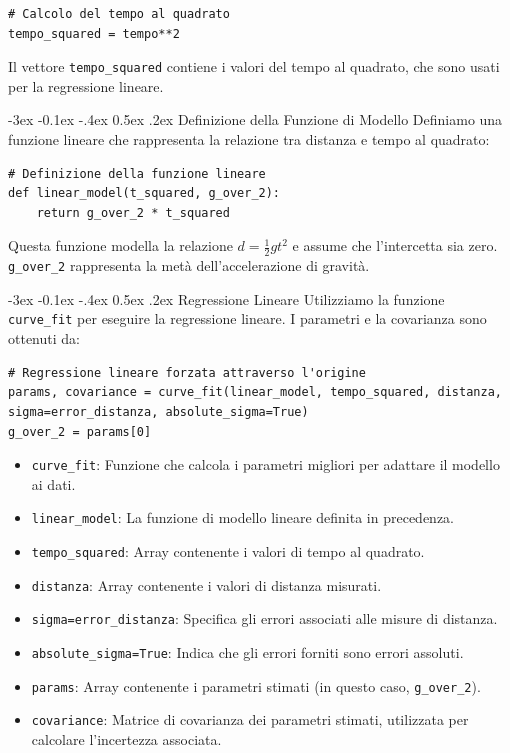 \documentclass[12pt,a4paper,oneside]{book}
\makeatletter
\renewcommand{\subsection}{\@startsection {subsection}{2}{\z@}
{-3ex \@plus -0.1ex \@minus -.4ex}
{0.5ex \@plus.2ex }
{\color[rgb]{0.141,0.596,0.749}\normalfont\sffamily\bfseries}}
\theoremstyle{esercizio}
\makeatother
\begin{document}
\begin{lstlisting}
# Calcolo del tempo al quadrato
tempo_squared = tempo**2
\end{lstlisting}

Il vettore \texttt{tempo\_squared} contiene i valori del tempo al quadrato, che sono usati per la regressione lineare.

\subsection{Definizione della Funzione di Modello}
Definiamo una funzione lineare che rappresenta la relazione tra distanza e tempo al quadrato:

\begin{lstlisting}
# Definizione della funzione lineare
def linear_model(t_squared, g_over_2):
    return g_over_2 * t_squared
\end{lstlisting}

Questa funzione modella la relazione \( d = \frac{1}{2} g t^2 \) e assume che l'intercetta sia zero. \texttt{g\_over\_2} rappresenta la metà dell'accelerazione di gravità.

\subsection{Regressione Lineare}
Utilizziamo la funzione \texttt{curve\_fit} per eseguire la regressione lineare. I parametri e la covarianza sono ottenuti da:

\begin{lstlisting}
# Regressione lineare forzata attraverso l'origine
params, covariance = curve_fit(linear_model, tempo_squared, distanza, sigma=error_distanza, absolute_sigma=True)
g_over_2 = params[0]
\end{lstlisting}

\begin{itemize}
    \item \texttt{curve\_fit}: Funzione che calcola i parametri migliori per adattare il modello ai dati.
    \item \texttt{linear\_model}: La funzione di modello lineare definita in precedenza.
    \item \texttt{tempo\_squared}: Array contenente i valori di tempo al quadrato.
    \item \texttt{distanza}: Array contenente i valori di distanza misurati.
    \item \texttt{sigma=error\_distanza}: Specifica gli errori associati alle misure di distanza.
    \item \texttt{absolute\_sigma=True}: Indica che gli errori forniti sono errori assoluti.
    \item \texttt{params}: Array contenente i parametri stimati (in questo caso, \texttt{g\_over\_2}).
    \item \texttt{covariance}: Matrice di covarianza dei parametri stimati, utilizzata per calcolare l'incertezza associata.
\end{itemize}
\end{document}
